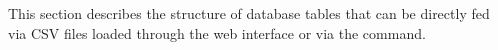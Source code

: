 This section describes the structure of database tables that can be
directly fed via CSV files loaded through the web interface or via the
 command.


